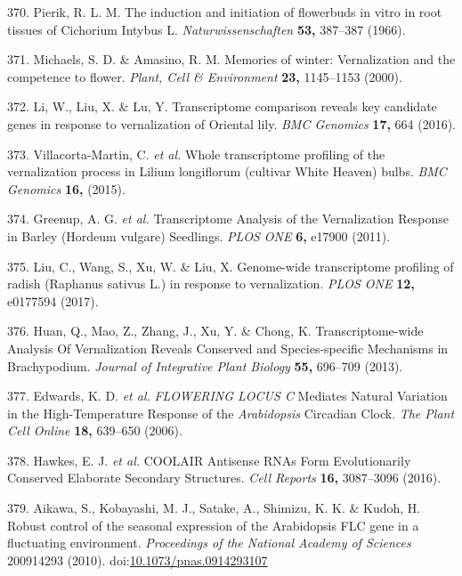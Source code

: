 \documentclass[12pt,]{book}
\begin{document}
\hypertarget{ref-pierik_cichorium_1966}{}
370. Pierik, R. L. M. The induction and initiation of flowerbuds in
vitro in root tissues of Cichorium Intybus L. \emph{Naturwissenschaften}
\textbf{53,} 387--387 (1966).

\hypertarget{ref-michaels_memories_2000}{}
371. Michaels, S. D. \& Amasino, R. M. Memories of winter: Vernalization
and the competence to flower. \emph{Plant, Cell \& Environment}
\textbf{23,} 1145--1153 (2000).

\hypertarget{ref-li_transcriptome_2016}{}
372. Li, W., Liu, X. \& Lu, Y. Transcriptome comparison reveals key
candidate genes in response to vernalization of Oriental lily. \emph{BMC
Genomics} \textbf{17,} 664 (2016).

\hypertarget{ref-villacorta_martin_whole_2015}{}
373. Villacorta-Martin, C. \emph{et al.} Whole transcriptome profiling
of the vernalization process in Lilium longiflorum (cultivar White
Heaven) bulbs. \emph{BMC Genomics} \textbf{16,} (2015).

\hypertarget{ref-greenup_transcriptome_2011}{}
374. Greenup, A. G. \emph{et al.} Transcriptome Analysis of the
Vernalization Response in Barley (Hordeum vulgare) Seedlings. \emph{PLOS
ONE} \textbf{6,} e17900 (2011).

\hypertarget{ref-liu_genome_wide_2017}{}
375. Liu, C., Wang, S., Xu, W. \& Liu, X. Genome-wide transcriptome
profiling of radish (Raphanus sativus L.) in response to vernalization.
\emph{PLOS ONE} \textbf{12,} e0177594 (2017).

\hypertarget{ref-huan_transcriptome_wide_2013}{}
376. Huan, Q., Mao, Z., Zhang, J., Xu, Y. \& Chong, K.
Transcriptome-wide Analysis Of Vernalization Reveals Conserved and
Species-specific Mechanisms in Brachypodium. \emph{Journal of
Integrative Plant Biology} \textbf{55,} 696--709 (2013).

\hypertarget{ref-edwards_flowering_2006}{}
377. Edwards, K. D. \emph{et al.} \emph{FLOWERING LOCUS C} Mediates
Natural Variation in the High-Temperature Response of the
\emph{Arabidopsis} Circadian Clock. \emph{The Plant Cell Online}
\textbf{18,} 639--650 (2006).

\hypertarget{ref-hawkes_coolair_2016}{}
378. Hawkes, E. J. \emph{et al.} COOLAIR Antisense RNAs Form
Evolutionarily Conserved Elaborate Secondary Structures. \emph{Cell
Reports} \textbf{16,} 3087--3096 (2016).

\hypertarget{ref-aikawa_robust_2010}{}
379. Aikawa, S., Kobayashi, M. J., Satake, A., Shimizu, K. K. \& Kudoh,
H. Robust control of the seasonal expression of the Arabidopsis FLC gene
in a fluctuating environment. \emph{Proceedings of the National Academy
of Sciences} 200914293 (2010).
doi:\href{https://doi.org/10.1073/pnas.0914293107}{10.1073/pnas.0914293107}
\end{document}
